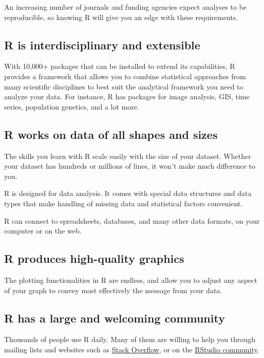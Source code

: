 \documentclass[]{book}
\begin{document}
An increasing number of journals and funding agencies expect analyses to
be reproducible, so knowing R will give you an edge with these
requirements.

\subsection{R is interdisciplinary and
extensible}\label{r-is-interdisciplinary-and-extensible}

With 10,000+ packages that can be installed to extend its capabilities,
R provides a framework that allows you to combine statistical approaches
from many scientific disciplines to best suit the analytical framework
you need to analyze your data. For instance, R has packages for image
analysis, GIS, time series, population genetics, and a lot more.

\subsection{R works on data of all shapes and
sizes}\label{r-works-on-data-of-all-shapes-and-sizes}

The skills you learn with R scale easily with the size of your dataset.
Whether your dataset has hundreds or millions of lines, it won't make
much difference to you.

R is designed for data analysis. It comes with special data structures
and data types that make handling of missing data and statistical
factors convenient.

R can connect to spreadsheets, databases, and many other data formats,
on your computer or on the web.

\subsection{R produces high-quality
graphics}\label{r-produces-high-quality-graphics}

The plotting functionalities in R are endless, and allow you to adjust
any aspect of your graph to convey most effectively the message from
your data.

\subsection{R has a large and welcoming
community}\label{r-has-a-large-and-welcoming-community}

Thousands of people use R daily. Many of them are willing to help you
through mailing lists and websites such as
\href{https://stackoverflow.com/}{Stack Overflow}, or on the
\href{https://community.rstudio.com/}{RStudio community}.
\end{document}
